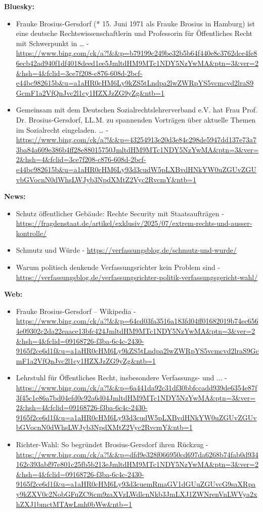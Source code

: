 \documentclass[12pt,a4paper]{article}
\begin{document}
\textbf{Bluesky:}
\begin{itemize}
\item Frauke Brosius-Gersdorf (* 15. Juni 1971 als Frauke Brosius in Hamburg) ist eine deutsche Rechtswissenschaftlerin und Professorin für Öffentliches Recht mit Schwerpunkt in … - \url{https://www.bing.com/ck/a?!&&p=b79199c249be32b5b64f440e8c3762dce4fe86ecb42ad940f1df4018deed1ee5JmltdHM9MTc1NDY5NzYwMA&ptn=3&ver=2&hsh=4&fclid=3ce7f208-c876-608d-2bcf-e44bc982615b&u=a1aHR0cHM6Ly9kZS5tLndpa2lwZWRpYS5vcmcvd2lraS9GcmF1a2VfQnJvc2l1cy1HZXJzZG9yZg&ntb=1}
\item Gemeinsam mit dem Deutschen Sozialrechtslehrerverband e.V. hat Frau Prof. Dr. Brosius-Gersdorf, LL.M. zu spannenden Vorträgen über aktuelle Themen im Sozialrecht eingeladen. … - \url{https://www.bing.com/ck/a?!&&p=43254913e20d3e84c298de5947dd137e73a73ba84a609e386b4ff28e88015750JmltdHM9MTc1NDY5NzYwMA&ptn=3&ver=2&hsh=4&fclid=3ce7f208-c876-608d-2bcf-e44bc982615b&u=a1aHR0cHM6Ly93d3cudW5pLXBvdHNkYW0uZGUvZGUvbGVocnN0dWhsLWJyb3NpdXMtZ2Vyc2RvcmY&ntb=1}
\end{itemize}

\textbf{News:}
\begin{itemize}
\item Schutz öffentlicher Gebäude: Rechte Security mit Staatsaufträgen - \url{https://fragdenstaat.de/artikel/exklusiv/2025/07/extrem-rechts-und-ausser-kontrolle/}
\item Schmutz und Würde - \url{https://verfassungsblog.de/schmutz-und-wurde/}
\item Warum politisch denkende Verfassungsrichter kein Problem sind - \url{https://verfassungsblog.de/verfassungsrichter-politik-verfassungsgericht-wahl/}
\end{itemize}

\textbf{Web:}
\begin{itemize}
\item Frauke Brosius-Gersdorf – Wikipedia - \url{https://www.bing.com/ck/a?!&&p=64cd03fa3516a183fd04ff01682019b74ec6564e09302c2da22eaace13bfc424JmltdHM9MTc1NDY5NzYwMA&ptn=3&ver=2&hsh=4&fclid=09168726-f3ba-6c4c-2430-9165f2ce6d1f&u=a1aHR0cHM6Ly9kZS5tLndpa2lwZWRpYS5vcmcvd2lraS9GcmF1a2VfQnJvc2l1cy1HZXJzZG9yZg&ntb=1}
\item Lehrstuhl für Öffentliches Recht, insbesondere Verfassungs- und ... - \url{https://www.bing.com/ck/a?!&&p=6a441da92c31df30bbfccadd939de6354e87f3f45c1e86a7bd04efd0c92a6d04JmltdHM9MTc1NDY5NzYwMA&ptn=3&ver=2&hsh=4&fclid=09168726-f3ba-6c4c-2430-9165f2ce6d1f&u=a1aHR0cHM6Ly93d3cudW5pLXBvdHNkYW0uZGUvZGUvbGVocnN0dWhsLWJyb3NpdXMtZ2Vyc2RvcmY&ntb=1}
\item Richter-Wahl: So begründet Brosius-Gersdorf ihren Rückzug - \url{https://www.bing.com/ck/a?!&&p=dfd9e328f066950cd697da6268b74fab0d934162c393abf97e801c25fb5b213eJmltdHM9MTc1NDY5NzYwMA&ptn=3&ver=2&hsh=4&fclid=09168726-f3ba-6c4c-2430-9165f2ce6d1f&u=a1aHR0cHM6Ly93d3cuemRmaGV1dGUuZGUvcG9saXRpay9kZXV0c2NobGFuZC9icm9zaXVzLWdlcnNkb3JmLXJ1ZWNrenVnLWVya2xhZXJ1bmctMTAwLmh0bWw&ntb=1}
\end{itemize}
\end{document}
